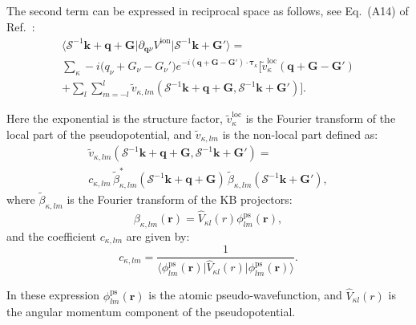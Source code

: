 \documentclass[final,3p,times,twocolumn]{elsarticle}
\begin{document}
The second term can be expressed in reciprocal space as follows, see Eq.~(A14) of Ref.~\cite{Baroni2001}:
\begin{multline}
\big\langle  \mathcal{S}^{-1}\mathbf{k}+\mathbf{q}+\mathbf{G}   \big|\partial_{\mathbf{q}\nu}V^{\text{ion}} \big| \mathcal{S}^{-1}\mathbf{k}+\mathbf{G}'  \big\rangle =\\
 \sum_\kappa -i \big( q_\nu + G_\nu -G_\nu' ) e^{-i(\mathbf{q+G-G'})\cdot \boldsymbol{\tau}_\kappa}
  \bigg[ \tilde{v}_\kappa^{\text{loc}}(\mathbf{q+G-G'}) \\
  + \sum_l \sum_{m=-l}^l \tilde{v}_{\kappa,lm} (\mathcal{S}^{-1}\mathbf{k}+\mathbf{q}+\mathbf{G},\mathcal{S}^{-1}\mathbf{k}+\mathbf{G}')   \bigg].
\end{multline}

Here the exponential is the structure factor, $\tilde{v}_\kappa^{\text{loc}}$ is the Fourier transform of the local part of the pseudopotential, and $\tilde{v}_{\kappa,lm}$ is the non-local part defined as:
\begin{multline}
  \tilde{v}_{\kappa,lm} (\mathcal{S}^{-1}\mathbf{k}+\mathbf{q}+\mathbf{G},\mathcal{S}^{-1}\mathbf{k}+\mathbf{G}') = \\
  c_{\kappa,lm}\, \tilde{\beta}_{\kappa,lm}^* (\mathcal{S}^{-1}\mathbf{k}+\mathbf{q}+\mathbf{G})\,\tilde{\beta}_{\kappa,lm} (\mathcal{S}^{-1}\mathbf{k}+\mathbf{G}'),
\end{multline}
where $\tilde{\beta}_{\kappa,lm}$ is the Fourier transform of the KB projectors:
\begin{equation}
\beta_{\kappa,lm}(\mathbf{r}) =  \hat{V}_{\kappa l}(r) \phi_{lm}^{\text{ps}}(\mathbf{r}),
\end{equation}
and the coefficient $c_{\kappa,lm}$ are given by:
\begin{equation}
c_{\kappa,lm} = \frac{1}{\big\langle \phi_{lm}^{\text{ps}}(\mathbf{r}) \big|  \hat{V}_{\kappa l}(r) \big| \phi_{lm}^{\text{ps}}(\mathbf{r}) \big\rangle }.
\end{equation}

In these expression $\phi_{lm}^{\text{ps}}(\mathbf{r})$ is the atomic pseudo-wavefunction, and $\hat{V}_{\kappa l}(r)$ is the angular momentum component of the pseudopotential. 
\end{document}

